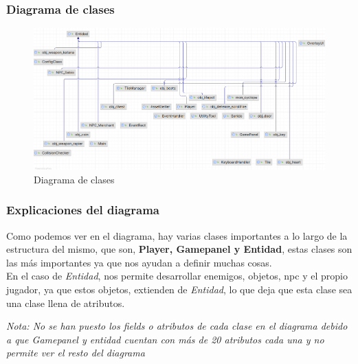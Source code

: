 \documentclass[a4paper]{article}
\begin{document}
\subsubsection{Diagrama de clases}
\begin{figure}[ht]
    \centering
    \includegraphics[width=1\textwidth]{Images/diagramadeclases.png}
    \caption{Diagrama de clases}
    \label{fig:diagrama-clases}
\end{figure}

\subsubsection{Explicaciones del diagrama}
Como podemos ver en el diagrama, hay varias clases importantes a lo largo de la estructura del mismo, que son, \textbf{Player, Gamepanel y Entidad}, estas clases son las más importantes ya que
nos ayudan a definir muchas cosas.\\
En el caso de \textit{Entidad}, nos permite desarrollar enemigos, objetos, npc y el propio jugador, ya que estos objetos, extienden de \textit{Entidad}, lo que deja que esta clase sea una clase llena de atributos.
\begin{flushright}
    \textit{Nota: No se han puesto los fields o atributos de cada clase en el diagrama debido a que Gamepanel y entidad cuentan con más de 20 atributos cada una y no permite ver el resto del diagrama}
\end{flushright}
\end{document}
